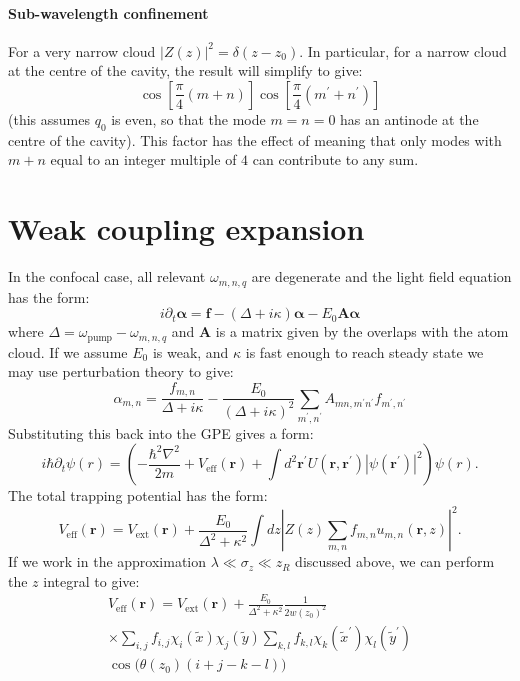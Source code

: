 \documentclass[twocolumn]{revtex4-1}
\renewcommand{\vec}[1]{\mathbf{#1}}
\begin{document}
\paragraph{Sub-wavelength confinement}
For a very narrow cloud $|Z(z)|^2 = \delta(z-z_0)$.  In particular,
for a narrow cloud at the centre of the cavity, the result will
simplify to give:
\begin{displaymath}
  \cos\left[ \frac{\pi}{4} (m+n) \right]
  \cos\left[ \frac{\pi}{4} (m^\prime+n^\prime) \right]
\end{displaymath}
(this assumes $q_0$ is even, so that the mode $m=n=0$ has an antinode
at the centre of the cavity).  This factor has the effect of meaning
that only modes with $m+n$ equal to an integer multiple of $4$ can
contribute to any sum.

\section{Weak coupling expansion}
\label{sec:weak-coupl-expans}

In the confocal case, all relevant $\omega_{m,n,q}$ are degenerate and
the light field equation has the form:
\begin{displaymath}
  i \partial_t \vec{\alpha} = 
  \vec{f} - (\Delta + i \kappa) \vec{\alpha}
  - E_0 \vec{A} \vec{\alpha}
\end{displaymath}
where $\Delta = \omega_{\text{pump}} - \omega_{m,n,q}$ and $\vec{A}$
is a matrix given by the overlaps with the atom cloud.  If we assume
$E_0$ is weak, and $\kappa$ is fast enough to reach steady state we
may use perturbation theory to give:
\begin{displaymath}
  \alpha_{m,n} = \frac{f_{m,n}}{\Delta+i\kappa}
  - \frac{E_0}{(\Delta+i\kappa)^2}
  \sum_{m^\prime, n^\prime} A_{mn, m^\prime n^\prime} f_{m^\prime,n^\prime}
\end{displaymath}
Substituting this back into the GPE gives a form:
\begin{displaymath}
  i \hbar \partial_t \psi(r) =
  \left(
    - \frac{\hbar^2 \nabla^2}{2m} 
    + V_{\text{eff}}(\vec{r}) 
    + \int d^2\vec{r}^\prime
    U(\vec{r}, \vec{r}^\prime) |\psi(\vec{r}^\prime)|^2
  \right)
  \psi(r).
\end{displaymath}
The total trapping potential has the form:
\begin{displaymath}
  V_{\text{eff}}(\vec{r}) 
  =
  V_{\text{ext}}(\vec{r}) 
  +
  \frac{E_0}{\Delta^2+\kappa^2}
  \int dz \left| Z(z)   \sum_{m,n} f_{m,n} u_{m,n}(\vec{r},z) \right|^2.
\end{displaymath}
If we work in the approximation $\lambda \ll \sigma_z \ll z_R$ discussed
above, we can perform the $z$ integral to give:
\begin{multline}
  V_{\text{eff}}(\vec{r}) 
  =
  V_{\text{ext}}(\vec{r}) 
  +
  \frac{E_0}{\Delta^2+\kappa^2}
  \frac{1}{2 w(z_0)^2}
  \\
  \times
  \sum_{i,j}  f_{i,j} \chi_i(\tilde{x}) \chi_j(\tilde{y})
  \sum_{k,l}f_{k,l} \chi_k(\tilde{x}^\prime) \chi_l(\tilde{y}^\prime)
  \\
  \cos\Big(\theta(z_0)(i+j-k-l)\Big)
\end{multline}
\end{document}
